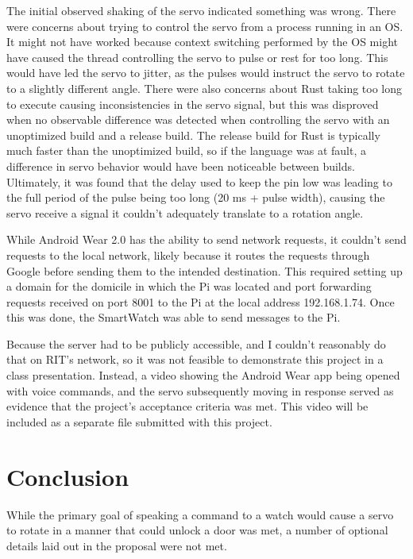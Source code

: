 \documentclass[a4paper]{article}
\begin{document}
The initial observed shaking of the servo indicated something was wrong.
There were concerns about trying to control the servo from a process running in an OS.
It might not have worked because context switching performed by the OS might have caused the thread controlling the servo to pulse or rest for too long.
This would have led the servo to jitter, as the pulses would instruct the servo to rotate to a slightly different angle.
There were also concerns about Rust taking too long to execute causing inconsistencies in the servo signal, but this was disproved when no observable difference was detected when controlling the servo with an unoptimized build and a release build.
The release build for Rust is typically much faster than the unoptimized build, so if the language was at fault, a difference in servo behavior would have been noticeable between builds.
Ultimately, it was found that the delay used to keep the pin low was leading to the full period of the pulse being too long (20 ms + pulse width), causing the servo receive a signal it couldn't adequately translate to a rotation angle.


While Android Wear 2.0 has the ability to send network requests, it couldn't send requests to the local network, likely because it routes the requests through Google before sending them to the intended destination.
This required setting up a domain for the domicile in which the Pi was located and port forwarding requests received on port 8001 to the Pi at the local address 192.168.1.74.
Once this was done, the SmartWatch was able to send messages to the Pi.

Because the server had to be publicly accessible, and I couldn't reasonably do that on RIT's network, so it was not feasible to demonstrate this project in a class presentation.
Instead, a video showing the Android Wear app being opened with voice commands, and the servo subsequently moving in response served as evidence that the project's acceptance criteria was met.
This video will be included as a separate file submitted with this project.


\section{Conclusion}\label{sec:conclusion}

While the primary goal of speaking a command to a watch would cause a servo to rotate in a manner that could unlock a door was met, a number of optional details laid out in the proposal were not met.
\end{document}

